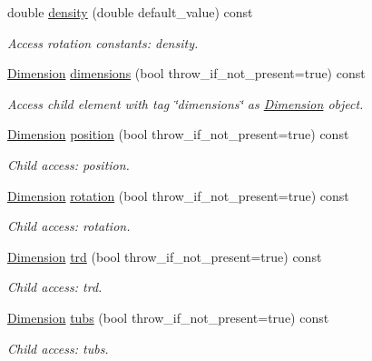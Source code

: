 \begin{DoxyCompactItemize}
double \hyperlink{struct_d_d4hep_1_1_x_m_l_1_1_dimension_a3fabac7226c38908bcbe79a1a1b3a69d}{density} (double default\+\_\+value) const
\begin{DoxyCompactList}\small\item\em Access rotation constants\+: density. \end{DoxyCompactList}\item 
\hyperlink{struct_d_d4hep_1_1_x_m_l_1_1_dimension}{Dimension} \hyperlink{struct_d_d4hep_1_1_x_m_l_1_1_dimension_a786fbde9f72e74d1d76c8fe9f0f56786}{dimensions} (bool throw\+\_\+if\+\_\+not\+\_\+present=true) const
\begin{DoxyCompactList}\small\item\em Access child element with tag \char`\"{}dimensions\char`\"{} as \hyperlink{struct_d_d4hep_1_1_x_m_l_1_1_dimension}{Dimension} object. \end{DoxyCompactList}\item 
\hyperlink{struct_d_d4hep_1_1_x_m_l_1_1_dimension}{Dimension} \hyperlink{struct_d_d4hep_1_1_x_m_l_1_1_dimension_abcca29a6b0483f52be66f7084e4d71d2}{position} (bool throw\+\_\+if\+\_\+not\+\_\+present=true) const
\begin{DoxyCompactList}\small\item\em Child access\+: position. \end{DoxyCompactList}\item 
\hyperlink{struct_d_d4hep_1_1_x_m_l_1_1_dimension}{Dimension} \hyperlink{struct_d_d4hep_1_1_x_m_l_1_1_dimension_a1dd6c902b4251be50f137efa1fc12ccf}{rotation} (bool throw\+\_\+if\+\_\+not\+\_\+present=true) const
\begin{DoxyCompactList}\small\item\em Child access\+: rotation. \end{DoxyCompactList}\item 
\hyperlink{struct_d_d4hep_1_1_x_m_l_1_1_dimension}{Dimension} \hyperlink{struct_d_d4hep_1_1_x_m_l_1_1_dimension_a25743826632c3f80843d1bc777cd6596}{trd} (bool throw\+\_\+if\+\_\+not\+\_\+present=true) const
\begin{DoxyCompactList}\small\item\em Child access\+: trd. \end{DoxyCompactList}\item 
\hyperlink{struct_d_d4hep_1_1_x_m_l_1_1_dimension}{Dimension} \hyperlink{struct_d_d4hep_1_1_x_m_l_1_1_dimension_a80cc1ac3f322e6316b98f4332e8211d6}{tubs} (bool throw\+\_\+if\+\_\+not\+\_\+present=true) const
\begin{DoxyCompactList}\small\item\em Child access\+: tubs. \end{DoxyCompactList}\item 

\end{DoxyCompactItemize}
